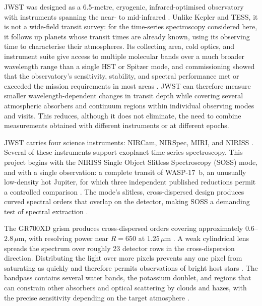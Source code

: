 JWST was designed as a 6.5-metre, cryogenic, infrared-optimised observatory with
instruments spanning the near- to mid-infrared
\citep{GardnerEtAl2006}. Unlike Kepler and TESS, it is not a wide-field transit
survey: for the time-series spectroscopy considered here, it follows up
planets whose transit times are already known, using its observing time to
characterise their atmospheres. Its collecting area, cold optics, and
instrument suite give access to multiple molecular bands over a much broader
wavelength range than a single HST or Spitzer mode, and commissioning showed
that the observatory's sensitivity, stability, and spectral performance met or
exceeded the mission requirements in most areas \citep{RigbyEtAl2023}. JWST
can therefore measure smaller wavelength-dependent changes in transit depth
while covering several atmospheric absorbers and continuum regions within
individual observing modes and visits. This reduces, although it does not
eliminate, the need to combine measurements obtained with different
instruments or at different epochs.


JWST carries four science instruments: NIRCam, NIRSpec, MIRI, and NIRISS
\citep{GardnerEtAl2006,AlbertEtAl2023}. Several of these instruments support
exoplanet time-series spectroscopy. This project begins with the NIRISS Single
Object Slitless Spectroscopy (SOSS) mode, and with a single observation: a
complete transit of WASP-17~b, an unusually low-density hot Jupiter, for which
three independent published reductions permit a controlled comparison
\citep{AndersonEtAl2010,LouieEtAl2025}. The mode's slitless, cross-dispersed
design produces curved spectral orders that overlap on the detector, making
SOSS a demanding test of spectral extraction \citep{AlbertEtAl2023}.

The GR700XD grism produces cross-dispersed orders covering approximately
$0.6$--$2.8\,\mu\mathrm{m}$, with resolving power near $R=650$ at
$1.25\,\mu\mathrm{m}$ \citep{AlbertEtAl2023}. A weak cylindrical lens spreads
the spectrum over roughly 23 detector rows in the cross-dispersion direction.
Distributing the light over more pixels prevents any one pixel from saturating
as quickly and therefore permits observations of bright host stars
\citep{AlbertEtAl2023}. The bandpass contains several water bands, the
potassium doublet, and regions that can constrain other absorbers and optical
scattering by clouds and hazes, with the precise sensitivity depending on the
target atmosphere
\citep{AlbertEtAl2023,HolmbergMadhusudhan2023,LouieEtAl2025}.


